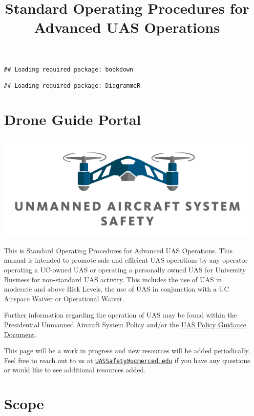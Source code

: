 \documentclass[
]{book}
\title{Standard Operating Procedures for Advanced UAS Operations}
\author{}
\date{\vspace{-2.5em}}
\begin{document}
\maketitle

{
\setcounter{tocdepth}{1}
\tableofcontents
}
\begin{verbatim}
## Loading required package: bookdown
\end{verbatim}

\begin{verbatim}
## Loading required package: DiagrammeR
\end{verbatim}

\chapter{Drone Guide Portal}\label{ch-getting-started}

\begin{center}\includegraphics[width=0.5\linewidth]{images/COE_logo} \end{center}

This is Standard Operating Procedures for Advanced UAS Operations. This manual is intended to promote safe and efficient UAS operations by any operator operating a UC-owned UAS or operating a personally owned UAS for University Business for non-standard UAS activity. This includes the use of UAS in moderate and above Risk Levels, the use of UAS in conjunction with a UC Airspace Waiver or Operational Waiver.

Further information regarding the operation of UAS may be found within the Presidential Unmanned Aircraft System Policy and/or the \href{https://ucdrones.github.io/Policy_Guidance/}{UAS Policy Guidance Document}.

This page will be a work in progress and new resources will be added periodically. Feel free to reach out to us at \href{mailto:UASSafety@ucmerced.edu}{\nolinkurl{UASSafety@ucmerced.edu}} if you have any questions or would like to see additional resources added.

\chapter{Scope}\label{ch-scope}
\end{document}
